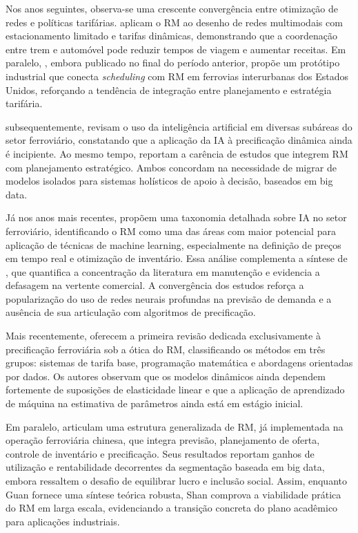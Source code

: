Nos anos seguintes, observa-se uma crescente convergência entre otimização de redes e políticas tarifárias. \citet{ZHENG2016} aplicam o RM ao desenho de redes multimodais com estacionamento limitado e tarifas dinâmicas, demonstrando que a coordenação entre trem e automóvel pode reduzir tempos de viagem e aumentar receitas. Em paralelo, \citet{Casey2014}, embora publicado no final do período anterior, propõe um protótipo industrial que conecta \textit{scheduling} com RM em ferrovias interurbanas dos Estados Unidos, reforçando a tendência de integração entre planejamento e estratégia tarifária.

subsequentemente, \citet{TANG2022} revisam o uso da inteligência artificial em diversas subáreas do setor ferroviário, constatando que a aplicação da IA à precificação dinâmica ainda é incipiente. Ao mesmo tempo, \citet{Ammirato2020} reportam a carência de estudos que integrem RM com planejamento estratégico. Ambos concordam na necessidade de migrar de modelos isolados para sistemas holísticos de apoio à decisão, baseados em big data.

Já nos anos mais recentes, \citet{Besinovic2022} propõem uma taxonomia detalhada sobre IA no setor ferroviário, identificando o RM como uma das áreas com maior potencial para aplicação de técnicas de machine learning, especialmente na definição de preços em tempo real e otimização de inventário. Essa análise complementa a síntese de \citet{TANG2022}, que quantifica a concentração da literatura em manutenção e evidencia a defasagem na vertente comercial. A convergência dos estudos reforça a popularização do uso de redes neurais profundas na previsão de demanda e a ausência de sua articulação com algoritmos de precificação.

Mais recentemente, \citet{Guan2023} oferecem a primeira revisão dedicada exclusivamente à precificação ferroviária sob a ótica do RM, classificando os métodos em três grupos: sistemas de tarifa base, programação matemática e abordagens orientadas por dados. Os autores observam que os modelos dinâmicos ainda dependem fortemente de suposições de elasticidade linear e que a aplicação de aprendizado de máquina na estimativa de parâmetros ainda está em estágio inicial.

Em paralelo, \citet{Shan2024} articulam uma estrutura generalizada de RM, já implementada na operação ferroviária chinesa, que integra previsão, planejamento de oferta, controle de inventário e precificação. Seus resultados reportam ganhos de utilização e rentabilidade decorrentes da segmentação baseada em big data, embora ressaltem o desafio de equilibrar lucro e inclusão social. Assim, enquanto Guan fornece uma síntese teórica robusta, Shan comprova a viabilidade prática do RM em larga escala, evidenciando a transição concreta do plano acadêmico para aplicações industriais.

